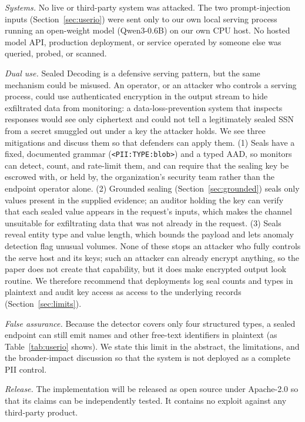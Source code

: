 \documentclass[conference,compsoc]{IEEEtran}
\newcommand{\code}[1]{\texttt{#1}}
\begin{document}
\textit{Systems.} No live or third-party system was attacked. The two prompt-injection inputs (Section~\ref{sec:userio}) were sent only to our own local serving process running an open-weight model (Qwen3-0.6B) on our own CPU host. No hosted model API, production deployment, or service operated by someone else was queried, probed, or scanned.

\textit{Dual use.} Sealed Decoding is a defensive serving pattern, but the same mechanism could be misused. An operator, or an attacker who controls a serving process, could use authenticated encryption in the output stream to hide exfiltrated data from monitoring: a data-loss-prevention system that inspects responses would see only ciphertext and could not tell a legitimately sealed SSN from a secret smuggled out under a key the attacker holds. We see three mitigations and discuss them so that defenders can apply them. (1) Seals have a fixed, documented grammar (\code{<PII:TYPE:blob>}) and a typed AAD, so monitors can detect, count, and rate-limit them, and can require that the sealing key be escrowed with, or held by, the organization's security team rather than the endpoint operator alone. (2) Grounded sealing (Section~\ref{sec:grounded}) seals only values present in the supplied evidence; an auditor holding the key can verify that each sealed value appears in the request's inputs, which makes the channel unsuitable for exfiltrating data that was not already in the request. (3) Seals reveal entity type and value length, which bounds the payload and lets anomaly detection flag unusual volumes. None of these stops an attacker who fully controls the serve host and its keys; such an attacker can already encrypt anything, so the paper does not create that capability, but it does make encrypted output look routine. We therefore recommend that deployments log seal counts and types in plaintext and audit key access as access to the underlying records (Section~\ref{sec:limits}).

\textit{False assurance.} Because the detector covers only four structured types, a sealed endpoint can still emit names and other free-text identifiers in plaintext (as Table~\ref{tab:userio} shows). We state this limit in the abstract, the limitations, and the broader-impact discussion so that the system is not deployed as a complete PII control.

\textit{Release.} The implementation will be released as open source under Apache-2.0 so that its claims can be independently tested. It contains no exploit against any third-party product.
\end{document}
